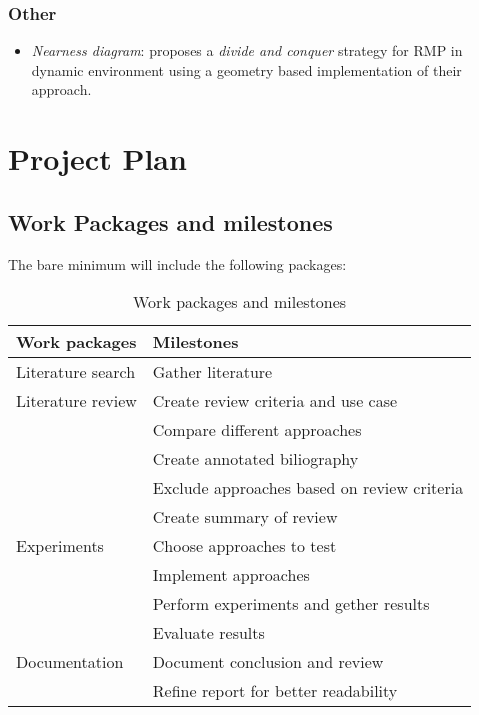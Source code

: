 \documentclass[rnd]{mas_proposal}
\begin{document}
\subsection{Other}
\begin{itemize}
    \item \textit{Nearness diagram}: \cite{minguez2004nearness} proposes a \textit{divide and conquer} strategy for RMP in dynamic environment using a geometry based implementation of their approach.
\end{itemize}


\chapter{Project Plan}

\section{Work Packages and milestones}
The bare minimum will include the following packages:
\begin{table}[ht!]
    \centering
    \begin{tabular}{|l|l|}
        \hline
        \textbf{Work packages} & \textbf{Milestones} \\\hline
        Literature search   & Gather literature \\\hline
        Literature review   & Create review criteria and use case \\
                            & Compare different approaches \\
                            & Create annotated biliography \\ 
                            & Exclude approaches based on review criteria \\ 
                            & Create summary of review \\\hline
        Experiments         & Choose approaches to test \\
                            & Implement approaches\\ 
                            & Perform experiments and gether results \\ 
                            & Evaluate results \\\hline 
        Documentation       & Document conclusion and review \\
                            & Refine report for better readability \\\hline 
    
    \end{tabular}
    \caption{Work packages and milestones\label{tab:workpackagesandmilestones}}
\end{table}
\end{document}
